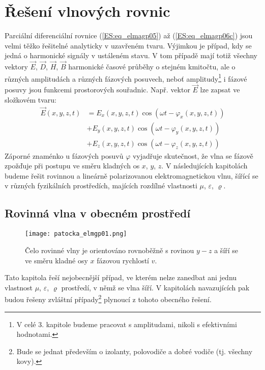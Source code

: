 {  \section{Řešení vlnových rovnic}
    Parciální diferenciální rovnice (\ref{ES:eq_elmagp05}) až (\ref{ES:eq_elmagp06c}) jsou velmi 
    těžko řešitelné analyticky v uzavřeném tvaru. Výjimkou je případ, kdy se jedná o harmonické 
    signály v ustáleném stavu. V tom případě mají totiž všechny vektory \(\vec{E}\), \(\vec{D}\), 
    \(\vec{H}\), \(\vec{B}\) harmonické časové průběhy o stejném kmitočtu, ale o různých 
    amplitudách a různých fázových posuvech, neboť amplitudy\footnote{V celé 3. kapitole budeme 
    pracovat s amplitudami, nikoli s efektivními hodnotami.} i fázové posuvy jsou funkcemi 
    prostorových souřadnic. Např. vektor \(\vec{E}\) lze zapsat ve složkovém tvaru:
    \begin{align}
     \vec{E}(x,y,z,t) &= E_x(x,y,z,t)\cos(\omega t - \varphi_x(x,y,z,t))  \nonumber   \\
                      &+ E_y(x,y,z,t)\cos(\omega t - \varphi_y(x,y,z,t))  \nonumber   \\
                      &+ E_z(x,y,z,t)\cos(\omega t - \varphi_z(x,y,z,t))  \label{ES:eq_elmagp07} 
    \end{align}
    Záporné znaménko u fázových posuvů \(\varphi\) vyjadřuje skutečnost, že vlna se fázově zpožďuje 
    při postupu ve směru kladných os \(x\), \(y\), \(z\). V následujících kapitolách budeme řešit 
    rovinnou a lineárně polarizovanou elektromagnetickou vlnu, šířící se v různých fyzikálních 
    prostředích, majících rozdílné vlastnosti \(\mu\), \(\varepsilon\), \(\varrho\).
    
    \subsection{Rovinná vlna v obecném prostředí}
    
      \begin{figure}[ht!]
        \centering
        \texttt{[image: patocka\_elmgp01.png]}
        \caption{Čelo rovinné vlny je orientováno rovnoběžně s rovinou \(y-z\) a šíří se ve směru 
                 kladné osy \(x\) fázovou rychlostí \(v\).\cite[s.~70]{Patocka4}}
        \label{ES:fig_elmgp01}
      \end{figure}
      Tato kapitola řeší nejobecnější případ, ve kterém nelze zanedbat ani jednu vlastnost \(\mu\), 
      \(\varepsilon\), \(\varrho\) prostředí, v němž se vlna šíří. V kapitolách navazujících pak 
      budou řešeny zvláštní případy\footnote{Bude se jednat především o izolanty, polovodiče a 
      dobré vodiče (tj. všechny kovy).} plynoucí z tohoto obecného řešení. 
  
}
